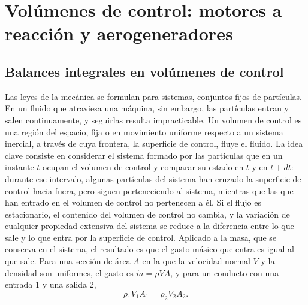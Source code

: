 \documentclass[10pt,openany]{book}
\begin{document}
\chapter{Volúmenes de control: motores a reacción y aerogeneradores}
\label{chap:c09}


\section{Balances integrales en volúmenes de control}

Las leyes de la mecánica se formulan para sistemas, conjuntos fijos de partículas. En un fluido que atraviesa una máquina, sin embargo, las partículas entran y salen continuamente, y seguirlas resulta impracticable. Un volumen de control es una región del espacio, fija o en movimiento uniforme respecto a un sistema inercial, a través de cuya frontera, la superficie de control, fluye el fluido. La idea clave consiste en considerar el sistema formado por las partículas que en un instante \(t\) ocupan el volumen de control y comparar su estado en \(t\) y en \(t + dt\): durante ese intervalo, algunas partículas del sistema han cruzado la superficie de control hacia fuera, pero siguen perteneciendo al sistema, mientras que las que han entrado en el volumen de control no pertenecen a él. Si el flujo es estacionario, el contenido del volumen de control no cambia, y la variación de cualquier propiedad extensiva del sistema se reduce a la diferencia entre lo que sale y lo que entra por la superficie de control. Aplicado a la masa, que se conserva en el sistema, el resultado es que el gasto másico que entra es igual al que sale. Para una sección de área \(A\) en la que la velocidad normal \(V\) y la densidad son uniformes, el gasto es \(\dot m = \rho V A\), y para un conducto con una entrada 1 y una salida 2,
\begin{equation}
\rho_1 V_1 A_1 = \rho_2 V_2 A_2. \label{eq:c09-masa}
\end{equation}
\end{document}

